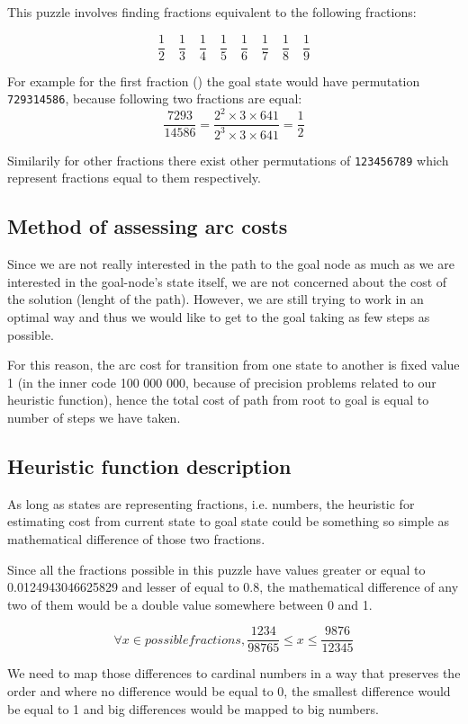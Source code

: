 \documentclass{article}
\begin{document}
This puzzle involves finding fractions equivalent to the following fractions: 

\[
 \frac{1}{2}\quad\frac{1}{3}\quad\frac{1}{4}\quad\frac{1}{5}\quad\frac{1}{6}\quad\frac{1}{7}\quad
 \frac{1}{8}\quad\frac{1}{9}
\]

For example for the first fraction () the goal state would have
permutation \texttt{729314586}, because following two fractions are equal:
\[\frac{7293}{14586} = \frac{2^2 \times 3 \times 641}{2^3 \times 3 \times 641} =
\frac{1}{2}\]

Similarily for other fractions there exist other permutations of
\texttt{123456789} which represent fractions equal to them respectively.

\subsection{Method of assessing arc costs}
Since we are not really interested in the path to the goal node as much as we
are interested in the goal-node's state itself, we are not concerned about
the cost of the solution (lenght of the path). However, we are still trying to
work in an optimal way and thus we would like to get to the goal taking as few steps as
possible.

For this reason, the arc cost for transition from one state to another is fixed
value 1 (in the inner code 100 000 000, because of precision problems related to
our heuristic function), hence the total cost of path from root to goal is equal
to number of steps we have taken.

\subsection{Heuristic function description}

As long as states are representing fractions, i.e. numbers, the heuristic
for estimating cost from current state to goal state could be something so
simple as mathematical difference of those two fractions.

Since all the fractions possible in this puzzle have values greater or equal to
0.0124943046625829 and lesser of equal to 0.8, the mathematical difference of
any two of them would be a double value somewhere between 0 and 1.

\[
 \forall x \in possible fractions, \frac{1234}{98765} \leq x \leq
 \frac{9876}{12345}
\]

We need to map those differences to cardinal numbers in a way that preserves
the order and where no difference would be equal to 0, the smallest difference
would be equal to 1 and big differences would be mapped to big numbers.
\end{document}
